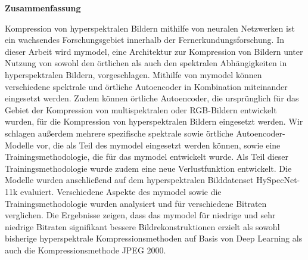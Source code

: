 \thispagestyle{empty}
\vspace*{1.4cm}

\begin{center}
    {\Large \textbf{Zusammenfassung}}
\end{center}

\vspace*{0.5cm}

\noindent 
Kompression von hyperspektralen Bildern mithilfe von neuralen Netzwerken ist ein wachsendes Forschungsgebiet innerhalb der Fernerkundungsforschung. In dieser Arbeit wird \ac{mymodel}, eine Architektur zur Kompression von Bildern unter Nutzung von sowohl den örtlichen als auch den spektralen Abhängigkeiten in hyperspektralen Bildern, vorgeschlagen. Mithilfe von \ac{mymodel} können verschiedene spektrale und örtliche Autoencoder in Kombination miteinander eingesetzt werden. Zudem können örtliche Autoencoder, die ursprünglich für das Gebiet der Kompression von multispektralen oder RGB-Bildern entwickelt wurden, für die Kompression von hyperspektralen Bildern eingesetzt werden. Wir schlagen außerdem mehrere spezifische spektrale sowie örtliche Autoencoder-Modelle vor, die als Teil des \ac{mymodel} eingesetzt werden können, sowie eine Trainingsmethodologie, die für das \ac{mymodel} entwickelt wurde. Als Teil dieser Trainingsmethodologie wurde zudem eine neue Verlustfunktion entwickelt. Die Modelle wurden anschließend auf dem hyperspektralen Bilddatenset HySpecNet-11k evaluiert. Verschiedene Aspekte des \ac{mymodel} sowie die Trainingsmethodologie wurden analysiert und für verschiedene Bitraten verglichen. Die Ergebnisse zeigen, dass das \ac{mymodel} für niedrige und sehr niedrige Bitraten signifikant bessere Bildrekonstruktionen erzielt als sowohl bisherige hyperspektrale Kompressionsmethoden auf Basis von Deep Learning als auch die Kompressionsmethode JPEG 2000.